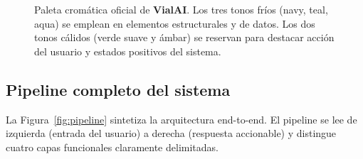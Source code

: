 \documentclass[11pt,a4paper]{article}
\newcommand{\VialAI}{\textbf{\textcolor{vialTeal}{Vial}\textcolor{vialAmber}{AI}}}
\begin{document}
\begin{figure}[H]
\centering
{}
\caption{Paleta cromática oficial de \VialAI. Los tres tonos fríos
(navy, teal, aqua) se emplean en elementos estructurales y de
datos. Los dos tonos cálidos (verde suave y ámbar) se reservan
para destacar acción del usuario y estados positivos del sistema.}
\label{fig:paleta}
\end{figure}

\subsection{Pipeline completo del sistema}

La Figura~\ref{fig:pipeline} sintetiza la arquitectura end-to-end.
El pipeline se lee de izquierda (entrada del usuario) a derecha
(respuesta accionable) y distingue cuatro capas funcionales
claramente delimitadas.
\end{document}
